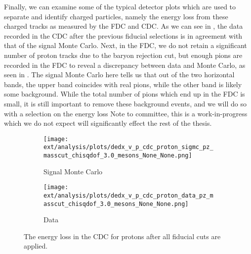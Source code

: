 Finally, we can examine some of the typical detector plots which are used to separate and identify charged particles, namely the energy loss from these charged tracks as measured by the FDC and CDC. As we can see in , the data recorded in the CDC after the previous fiducial selections is in agreement with that of the signal Monte Carlo. Next, in the FDC, we do not retain a significant number of proton tracks due to the baryon rejection cut, but enough pions are recorded in the FDC to reveal a discrepancy between data and Monte Carlo, as seen in . The signal Monte Carlo here tells us that out of the two horizontal bands, the upper band coincides with real pions, while the other band is likely some background. While the total number of pions which end up in the FDC is small, it is still important to remove these background events, and we will do so with a selection on the energy loss {\color{red}Note to committee, this is a work-in-progress which we do not expect will significantly effect the rest of the thesis}.


\begin{figure}
    \centering
    \begin{subfigure}{0.45\textwidth}
        \texttt{[image: ext/analysis/plots/dedx\_v\_p\_cdc\_proton\_sigmc\_pz\_masscut\_chisqdof\_3.0\_mesons\_None\_None.png]}
        \caption{Signal Monte Carlo}
    \end{subfigure}
    \hfill
    \begin{subfigure}{0.45\textwidth}
        \texttt{[image: ext/analysis/plots/dedx\_v\_p\_cdc\_proton\_data\_pz\_masscut\_chisqdof\_3.0\_mesons\_None\_None.png]}
        \caption{Data}
    \end{subfigure}
    \caption{The energy loss in the CDC for protons after all fiducial cuts are applied.}\label{fig:dedx-v-p-cdc-proton-pz-masscut-chisqdof-3.0-mesons}
\end{figure}

